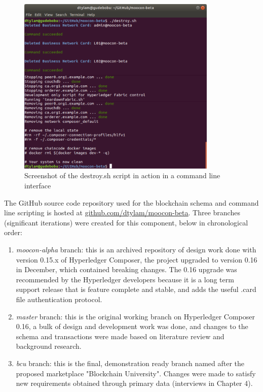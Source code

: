 \begin{enumerate}
\begin{figure}[!ht]
		      \includegraphics[width=0.85\textwidth]{destroysh}
		      \caption[Blockchain Teardown Script Screenshot]
		      {Screenshot of the destroy.sh script in action in a command line interface}
		      \label{fig:destroysh}
	      \end{figure}
\end{enumerate}

The GitHub source code repository used for the blockchain schema and command line scripting
is hosted at \href{https://github.com/dtylam/moocon-beta}{\underline{github.com/dtylam/moocon-beta}}.
Three branches (significant iterations) were created for this component, below in chronological order:
\begin{enumerate}
	\setlength\itemsep{0em}
	\item \textit{moocon-alpha} branch: this is an archived repository of design work done with version 0.15.x of
	      Hyperledger Composer, the project upgraded to version 0.16 in December, which contained breaking changes.
	      The 0.16 upgrade was recommended by the Hyperledger developers because it is a long term support
	      release that is feature complete and stable, and adds the useful .card file authentication protocol.
	\item \textit{master} branch: this is the original working branch on Hyperledger Composer 0.16, a bulk of
	      design and development work was done, and changes to the schema and transactions were made based on
	      literature review and background research.
	\item \textit{bcu} branch: this is the final, demonstration ready branch named after the proposed marketplace
	      "Blockchain University". Changes were made to satisfy new requirements obtained through primary data (interviews in Chapter 4).
\end{enumerate}

